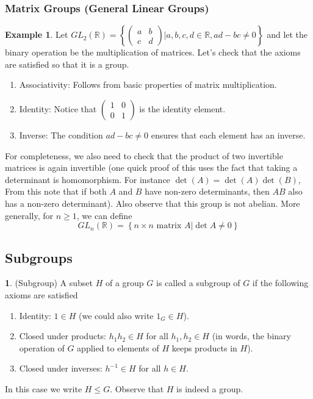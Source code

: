 \documentclass[12pt]{article}
\theoremstyle{definition}
\newtheorem{definition}{\color{NavyBlue}{\textbf{Definition}}}
\newtheorem{example}{\color{WildStrawberry}Example}
\theoremstyle{definition}
\begin{document}
\subsubsection{Matrix Groups (General Linear Groups)}
\begin{example}
Let $GL_2(\mathbb{R}) = \left\{ \begin{pmatrix} a & b \\ c & d \end{pmatrix} \Big\vert a,b,c,d \in \mathbb{R}, ad-bc \neq 0 \right\}$ and let the binary operation be the multiplication of matrices. Let's check that the axioms are satisfied so that it is a group.
\begin{enumerate}
\item Associativity: Follows from basic properties of matrix multiplication. 
\item Identity: Notice that $\begin{pmatrix} 1 & 0 \\ 0 & 1 \end{pmatrix}$ is the identity element.
\item Inverse: The condition $ad-bc \neq 0$ ensures that each element has an inverse.
\end{enumerate}
For completeness, we also need to check that the product of two invertible matrices is again invertible (one quick proof of this uses the fact that taking a determinant is homomorphism. For instance $\det(A) = \det(A)\det(B)$, From this note that if both $A$ and $B$ have non-zero determinants, then $AB$ also has a non-zero determinant). Also observe that this group is not abelian. More generally, for $n\geq 1$, we can define
\begin{equation}
GL_n(\mathbb{R}) = \left\{ n\times n \text{ matrix } A \Big\vert \det{A} \neq 0 \right\}
\end{equation}
\end{example}

\subsection{Subgroups}
\begin{definition}(Subgroup)
A subset $H$ of a group $G$ is called a subgroup of $G$ if the following axioms are satisfied
\begin{enumerate}
\item Identity: $1 \in H$ (we could also write $1_G \in H$).
\item Closed under products: $h_1 h_2 \in H$ for all $h_1, h_2 \in H$ (in words, the binary operation of $G$ applied to elements of $H$ keeps products in $H$). 
\item Closed under inverses: $h^{-1} \in H$ for all $h\in H$. 
\end{enumerate}
In this case we write $H \leq G$. Observe that $H$ is indeed a group.
\end{definition}
\end{document}
